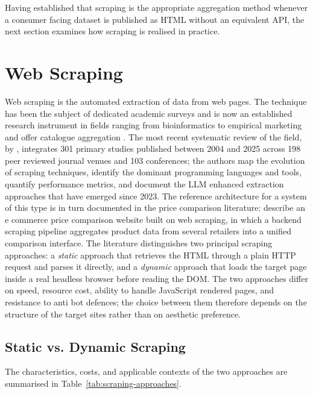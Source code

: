 Having established that scraping is the appropriate aggregation method whenever a consumer facing dataset is published as HTML without an equivalent API, the next section examines how scraping is realised in practice.

\section{Web Scraping}

Web scraping is the automated extraction of data from web pages. The technique has been the subject of dedicated academic surveys and is now an established research instrument in fields ranging from bioinformatics \parencite{GlezPena2014} to empirical marketing \parencite{BoegershausenDatta2022} and offer catalogue aggregation \parencite{Mitchell2018}. The most recent systematic review of the field, by \textcite{KahlonSingh2026}, integrates 301 primary studies published between 2004 and 2025 across 198 peer reviewed journal venues and 103 conferences; the authors map the evolution of scraping techniques, identify the dominant programming languages and tools, quantify performance metrics, and document the LLM enhanced extraction approaches that have emerged since 2023. The reference architecture for a system of this type is in turn documented in the price comparison literature: \textcite{ShaikhKhan2023} describe an e commerce price comparison website built on web scraping, in which a backend scraping pipeline aggregates product data from several retailers into a unified comparison interface. The literature distinguishes two principal scraping approaches: a \emph{static} approach that retrieves the HTML through a plain HTTP request and parses it directly, and a \emph{dynamic} approach that loads the target page inside a real headless browser before reading the DOM. The two approaches differ on speed, resource cost, ability to handle JavaScript rendered pages, and resistance to anti bot defences; the choice between them therefore depends on the structure of the target sites rather than on aesthetic preference.

\subsection{Static vs. Dynamic Scraping}

The characteristics, costs, and applicable contexts of the two approaches are summarised in Table~\ref{tab:scraping-approaches}.

